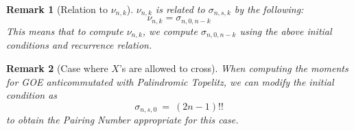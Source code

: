 \documentclass{article}
\newtheorem{remark}{Remark}
\begin{document}
\begin{remark}[Relation to \(\nu_{n, k}\)]
\(\nu_{n, k}\) is related to \(\sigma_{n, s, k}\) by the following:
\[
\nu_{n, k} = \sigma_{n, 0, n - k}
\]
This means that to compute \(\nu_{n, k}\), we compute \(\sigma_{n, 0, n - k}\) 
using the above initial conditions and recurrence relation. 
\end{remark}

\begin{remark}[Case where $X$'s are allowed to cross]
    When computing the moments for GOE anticommutated 
    with Palindromic Topelitz, we can modify the initial condition as 
    \[
        \sigma_{n, s, 0} \ = \ (2n - 1)!!
    \]
    to obtain the Pairing Number appropriate for this case. 
\end{remark}
\end{document}
